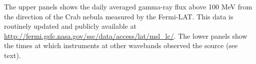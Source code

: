 The upper panels shows the daily averaged gamma-ray flux above 100 MeV from the direction of the Crab nebula measured by the Fermi-LAT. This data is routinely updated and publicly available at \url{http://fermi.gsfc.nasa.gov/ssc/data/access/lat/msl_lc/}. The lower panels show the times at which instruments at other wavebands observed the source (see text).\label{fig:lc}